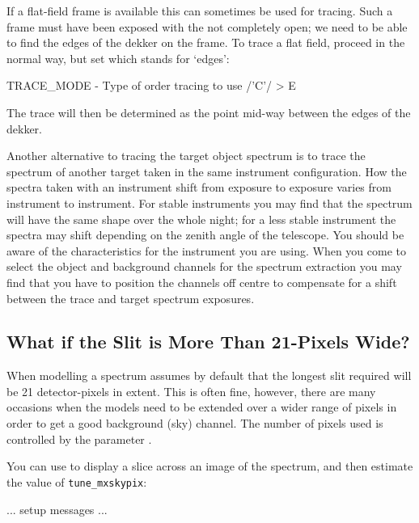 \documentclass[twoside,11pt]{starlink}
\providecommand{\mlabel}[1]{\xlabel{#1}\label{#1}}
\providecommand{\scspec}[2]{#1}
\begin{document}
If a flat-field frame is available this can sometimes be used for tracing.
Such a frame must have been exposed with the 
not completely open;
we need to be able to find the edges of the dekker on the frame.
To trace a flat field, proceed in the normal way, but set  which stands for `edges':

{
\scspec{\small}{ }
\begin{terminalv}
   TRACE_MODE - Type of order tracing to use /'C'/ > E
\end{terminalv}
}

The trace will then be determined as the point mid-way between the
edges of the dekker.

Another alternative to tracing the target object spectrum is to trace the
spectrum of another target taken in the same instrument configuration.
How the spectra taken with an instrument shift from exposure to exposure
varies from instrument to instrument.  For stable instruments you may
find that the spectrum will have the same shape over the whole night;
for a less stable instrument the spectra may shift depending on the zenith
angle of the telescope.  You should be aware of the characteristics for the
instrument you are using.  When you come to select the object and background
channels for the spectrum extraction you may find that you have to position
the channels off centre to compensate for a shift between the trace and
target spectrum exposures.


\subsection{\mlabel{cook_wide_slit}What if the Slit is More Than
            21-Pixels Wide?}

When modelling a spectrum  assumes by default
that the longest slit required will be 21 detector-pixels in extent.
This is often fine, however, there are many occasions when the models
need to be extended over a wider range of pixels in order to get a good
background (sky) channel.  The number of pixels used is controlled
by the parameter \@.

You can use  to display a slice across an image
of the spectrum,
and then estimate the value of \verb+tune_mxskypix+:

{
\scspec{\small}{ }
\begin{terminalv}
   ... setup messages ...
\end{terminalv}
}
\end{document}
